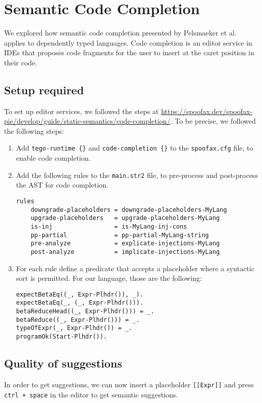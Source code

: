 \chapter{\label{chap:editor-services}Semantic Code Completion}
 
We explored how semantic code completion presented by Pelsmaeker et al.~\cite{codecompletion} applies to dependently typed languages. Code completion is an editor service in IDEs that proposes code fragments for the user to insert at the caret position in their code.

\section{Setup required}
To set up editor services, we followed the steps at  \url{https://spoofax.dev/spoofax-pie/develop/guide/static-semantics/code-completion/}. To be precise, we followed the following steps:
\begin{enumerate}
	\item Add \verb|tego-runtime {}| and \verb|code-completion {}| to the \verb|spoofax.cfg| file, to enable code completion.
	\item Add the following rules to the \verb|main.str2| file, to pre-process and post-process the AST for code completion.
	\begin{lstlisting}
rules
	downgrade-placeholders = downgrade-placeholders-MyLang
	upgrade-placeholders   = upgrade-placeholders-MyLang
	is-inj                 = is-MyLang-inj-cons
	pp-partial             = pp-partial-MyLang-string
	pre-analyze            = explicate-injections-MyLang
	post-analyze           = implicate-injections-MyLang
	\end{lstlisting}
	\item For each rule define a predicate that accepts a placeholder where a syntactic sort is permitted. For our language, those are the following:
	\begin{lstlisting}
expectBetaEq((_, Expr-Plhdr()), _).
expectBetaEq(_, (_, Expr-Plhdr())).
betaReduceHead((_, Expr-Plhdr())) = _.
betaReduce((_, Expr-Plhdr())) = _.
typeOfExpr(_, Expr-Plhdr()) = _.
programOk(Start-Plhdr()).
	\end{lstlisting}
	
\end{enumerate}

\section{Quality of suggestions}
In order to get suggestions, we can now insert a placeholder \verb|[[Expr]]| and press \verb|ctrl + space| in the editor to get semantic suggestions.

